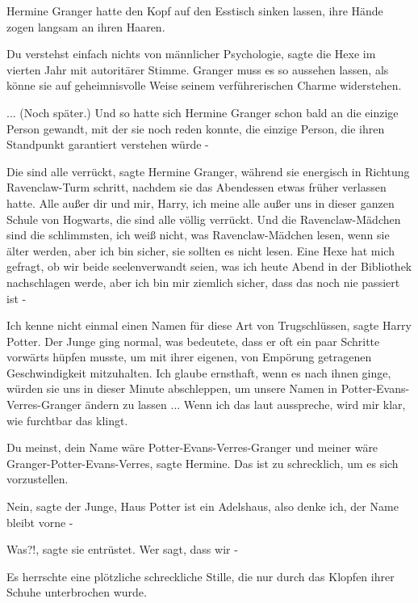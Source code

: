 Hermine Granger hatte den Kopf auf den Esstisch sinken lassen, ihre Hände zogen
langsam an ihren Haaren.

\glqq{}Du verstehst einfach nichts von männlicher Psychologie\grqq{}, sagte die
Hexe im vierten Jahr mit autoritärer Stimme. \glqq{}Granger muss es so aussehen
lassen, als könne sie auf geheimnisvolle Weise seinem verführerischen Charme
widerstehen.\grqq{}

... (Noch später.) Und so hatte sich Hermine Granger schon bald an die einzige
Person gewandt, mit der sie noch reden konnte, die einzige Person, die ihren
Standpunkt garantiert verstehen würde -

\glqq{}Die sind alle verrückt\grqq{}, sagte Hermine Granger, während sie
energisch in Richtung Ravenclaw-Turm schritt, nachdem sie das Abendessen etwas
früher verlassen hatte. \glqq{}Alle außer dir und mir, Harry, ich meine alle
außer uns in dieser ganzen Schule von Hogwarts, die sind alle völlig verrückt.
Und die Ravenclaw-Mädchen sind die schlimmsten, ich weiß nicht, was
Ravenclaw-Mädchen lesen, wenn sie älter werden, aber ich bin sicher, sie sollten
es nicht lesen. Eine Hexe hat mich gefragt, ob wir beide seelenverwandt seien,
was ich heute Abend in der Bibliothek nachschlagen werde, aber ich bin mir
ziemlich sicher, dass das noch nie passiert ist -\grqq{}

\glqq{}Ich kenne nicht einmal einen Namen für diese Art von Trugschlüssen\grqq{},
sagte Harry Potter. Der Junge ging normal, was bedeutete, dass er oft ein paar
Schritte vorwärts hüpfen musste, um mit ihrer eigenen, von Empörung getragenen
Geschwindigkeit mitzuhalten. \glqq{}Ich glaube ernsthaft, wenn es nach ihnen
ginge, würden sie uns in dieser Minute abschleppen, um unsere Namen in
Potter-Evans-Verres-Granger ändern zu lassen ... Wenn ich das laut ausspreche,
wird mir klar, wie furchtbar das klingt.\grqq{}

\glqq{}Du meinst, dein Name wäre Potter-Evans-Verres-Granger und meiner wäre
Granger-Potter-Evans-Verres\grqq{}, sagte Hermine. \glqq{}Das ist zu schrecklich,
um es sich vorzustellen.\grqq{}

\glqq{}Nein\grqq{}, sagte der Junge, \glqq{}Haus Potter ist ein Adelshaus, also
denke ich, der Name bleibt vorne -\grqq{}

\glqq{}Was?!\grqq{}, sagte sie entrüstet. \glqq{}Wer sagt, dass wir -\grqq{}

Es herrschte eine plötzliche schreckliche Stille, die nur durch das Klopfen
ihrer Schuhe unterbrochen wurde.

